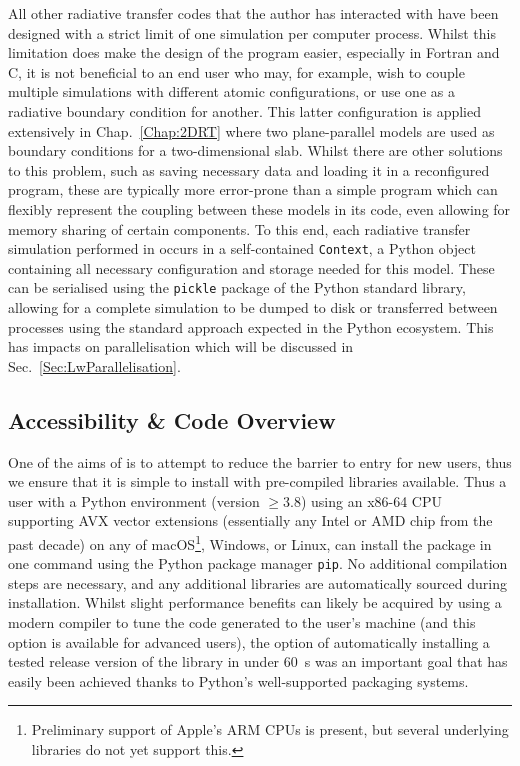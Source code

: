 All other radiative transfer codes that the author has interacted with have been designed with a strict limit of one simulation per computer process.
Whilst this limitation does make the design of the program easier, especially in Fortran and C, it is not beneficial to an end user who may, for example, wish to couple multiple simulations with different atomic configurations, or use one as a radiative boundary condition for another.
This latter configuration is applied extensively in Chap.~\ref{Chap:2DRT} where two plane-parallel models are used as boundary conditions for a two-dimensional slab.
Whilst there are other solutions to this problem, such as saving necessary data and loading it in a reconfigured program, these are typically more error-prone than a simple program which can flexibly represent the coupling between these models in its code, even allowing for memory sharing of certain components.
To this end, each radiative transfer simulation performed in \Lw{} occurs in a self-contained \texttt{Context}, a Python object containing all necessary configuration and storage needed for this model.
These can be serialised using the \texttt{pickle} package of the Python standard library, allowing for a complete simulation to be dumped to disk or transferred between processes using the standard approach expected in the Python ecosystem.
This has impacts on parallelisation which will be discussed in Sec.~\ref{Sec:LwParallelisation}.

\subsection{Accessibility \& Code Overview}

One of the aims of \Lw{} is to attempt to reduce the barrier to entry for new users, thus we ensure that it is simple to install with pre-compiled libraries available.
Thus a user with a Python environment (version $\ge3.8$) using an x86-64 CPU supporting AVX vector extensions (essentially any Intel or AMD chip from the past decade) on any of macOS\footnote{Preliminary support of Apple's ARM CPUs is present, but several underlying libraries do not yet support this.}, Windows, or Linux, can install the package in one command using the Python package manager \texttt{pip}.
No additional compilation steps are necessary, and any additional libraries are automatically sourced during installation.
Whilst slight performance benefits can likely be acquired by using a modern compiler to tune the code generated to the user's machine (and this option is available for advanced users), the option of automatically installing a tested release version of the library in under \SI{60}{\second} was an important goal that has easily been achieved thanks to Python's well-supported packaging systems.

